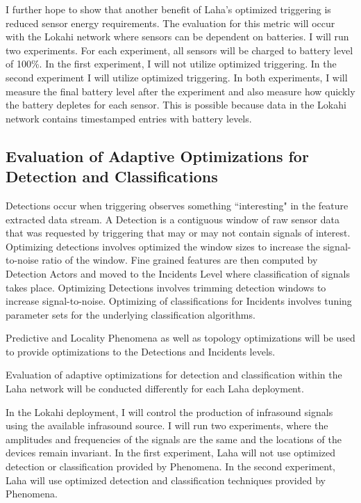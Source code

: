I further hope to show that another benefit of Laha's optimized triggering is reduced sensor energy requirements. The evaluation for this metric will occur with the Lokahi network where sensors can be dependent on batteries. I will run two experiments. For each experiment, all sensors will be charged to battery level of 100\%. In the first experiment, I will not utilize optimized triggering. In the second experiment I will utilize optimized triggering. In both experiments, I will measure the final battery level after the experiment and also measure how quickly the battery depletes for each sensor. This is possible because data in the Lokahi network contains timestamped entries with battery levels.

\subsection{Evaluation of Adaptive Optimizations for Detection and Classifications}
Detections occur when triggering observes something ``interesting" in the feature extracted data stream. A Detection is a contiguous window of raw sensor data that was requested by triggering that may or may not contain signals of interest. Optimizing detections involves optimized the window sizes to increase the signal-to-noise ratio of the window. Fine grained features are then computed by Detection Actors and moved to the Incidents Level where classification of signals takes place. Optimizing Detections involves trimming detection windows to increase signal-to-noise. Optimizing of classifications for Incidents involves tuning parameter sets for the underlying classification algorithms. 

Predictive and Locality Phenomena as well as topology optimizations will be used to provide optimizations to the Detections and Incidents levels. 

Evaluation of adaptive optimizations for detection and classification within the Laha network will be conducted differently for each Laha deployment.

In the Lokahi deployment, I will control the production of infrasound signals using the available infrasound source. I will run two experiments, where the amplitudes and frequencies of the signals are the same and the locations of the devices remain invariant. In the first experiment, Laha will not use optimized detection or classification provided by Phenomena. In the second experiment, Laha will use optimized detection and classification techniques provided by Phenomena. 

